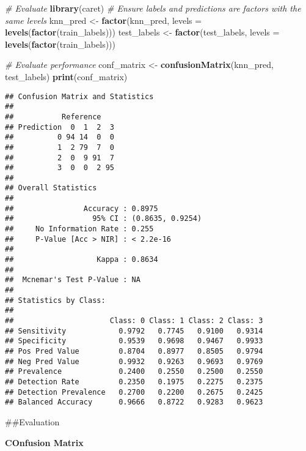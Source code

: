\documentclass[
]{article}
\newenvironment{Shaded}{\begin{snugshade}}{\end{snugshade}}
\newcommand{\AttributeTok}[1]{\textcolor[rgb]{0.13,0.29,0.53}{#1}}
\newcommand{\CommentTok}[1]{\textcolor[rgb]{0.56,0.35,0.01}{\textit{#1}}}
\newcommand{\FunctionTok}[1]{\textcolor[rgb]{0.13,0.29,0.53}{\textbf{#1}}}
\newcommand{\NormalTok}[1]{#1}
\newcommand{\OtherTok}[1]{\textcolor[rgb]{0.56,0.35,0.01}{#1}}
\begin{document}
\begin{Shaded}
\begin{Highlighting}[]
\CommentTok{\# Evaluate}
\FunctionTok{library}\NormalTok{(caret)}
\CommentTok{\# Ensure labels and predictions are factors with the same levels}
\NormalTok{knn\_pred }\OtherTok{\textless{}{-}} \FunctionTok{factor}\NormalTok{(knn\_pred, }\AttributeTok{levels =} \FunctionTok{levels}\NormalTok{(}\FunctionTok{factor}\NormalTok{(train\_labels)))}
\NormalTok{test\_labels }\OtherTok{\textless{}{-}} \FunctionTok{factor}\NormalTok{(test\_labels, }\AttributeTok{levels =} \FunctionTok{levels}\NormalTok{(}\FunctionTok{factor}\NormalTok{(train\_labels)))}

\CommentTok{\# Evaluate performance}
\NormalTok{conf\_matrix }\OtherTok{\textless{}{-}} \FunctionTok{confusionMatrix}\NormalTok{(knn\_pred, test\_labels)}
\FunctionTok{print}\NormalTok{(conf\_matrix)}
\end{Highlighting}
\end{Shaded}

\begin{verbatim}
## Confusion Matrix and Statistics
## 
##           Reference
## Prediction  0  1  2  3
##          0 94 14  0  0
##          1  2 79  7  0
##          2  0  9 91  7
##          3  0  0  2 95
## 
## Overall Statistics
##                                           
##                Accuracy : 0.8975          
##                  95% CI : (0.8635, 0.9254)
##     No Information Rate : 0.255           
##     P-Value [Acc > NIR] : < 2.2e-16       
##                                           
##                   Kappa : 0.8634          
##                                           
##  Mcnemar's Test P-Value : NA              
## 
## Statistics by Class:
## 
##                      Class: 0 Class: 1 Class: 2 Class: 3
## Sensitivity            0.9792   0.7745   0.9100   0.9314
## Specificity            0.9539   0.9698   0.9467   0.9933
## Pos Pred Value         0.8704   0.8977   0.8505   0.9794
## Neg Pred Value         0.9932   0.9263   0.9693   0.9769
## Prevalence             0.2400   0.2550   0.2500   0.2550
## Detection Rate         0.2350   0.1975   0.2275   0.2375
## Detection Prevalence   0.2700   0.2200   0.2675   0.2425
## Balanced Accuracy      0.9666   0.8722   0.9283   0.9623
\end{verbatim}

\#\#Evaluation

\textbf{COnfusion Matrix}
\end{document}
